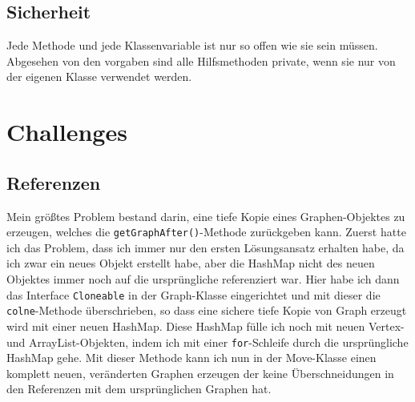 \documentclass[12pt,a4paper]{article}
\begin{document}
\subsection*{Sicherheit}
Jede Methode und jede Klassenvariable ist nur so offen wie sie sein müssen. Abgesehen von den vorgaben sind alle Hilfsmethoden private, wenn sie nur von der eigenen Klasse verwendet werden.

\section{Challenges}
\subsection{Referenzen}
Mein größtes Problem bestand darin, eine tiefe Kopie eines Graphen-Objektes zu erzeugen, welches die \texttt{getGraphAfter()}-Methode zurückgeben kann. Zuerst hatte ich das Problem, dass ich immer nur den ersten Lösungsansatz erhalten habe, da ich zwar ein neues Objekt erstellt habe, aber die HashMap nicht des neuen Objektes immer noch auf die ursprüngliche referenziert war. Hier habe ich dann das Interface \texttt{Cloneable} in der Graph-Klasse eingerichtet und mit dieser die \texttt{colne}-Methode überschrieben, so dass eine sichere tiefe Kopie von Graph erzeugt wird mit einer neuen HashMap. Diese HashMap fülle ich noch mit neuen Vertex- und ArrayList-Objekten, indem ich mit einer \texttt{for}-Schleife durch die ursprüngliche HashMap gehe. Mit dieser Methode kann ich nun in der Move-Klasse einen komplett neuen, veränderten Graphen erzeugen der keine Überschneidungen in den Referenzen mit dem ursprünglichen Graphen hat.
\end{document}
